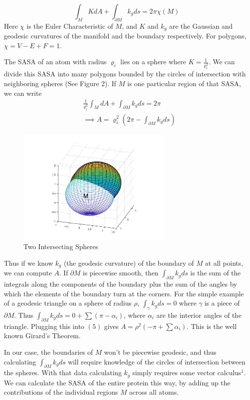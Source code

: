 \documentclass{article}
\begin{document}
\begin{equation}
\int_M KdA + \int_{\partial M} k_g ds = 2\pi\chi(M)
\end{equation}
Here $\chi$ is the Euler Characteristic of $M$, and $K$ and $k_g$ are the Gaussian and geodesic curvatures of the manifold and the boundary respectively. For polygons, $\chi=V-E+F=1$. 

The SASA of an atom with radius $\varrho_i$ lies on a sphere where $K=\frac{1}{\varrho_i^2}$. We can divide this SASA into many polygons bounded by the circles of intersection with neighboring spheres (See Figure 2). If $M$ is one particular region of that SASA, we can write 
\begin{align}\nonumber
&\frac{1}{\varrho_i^2}\int_M dA + \int_{\partial M} k_g ds= 2\pi \\
&\implies A=\varrho_i^2\left(2\pi-\int_{\partial M} k_g ds\right)
\end{align}

\begin{figure}[h!]
\caption{Two Intersecting Spheres}
\centerline{\includegraphics[width=3in]{spheres}}
\end{figure}
Thus if we know $k_g$ (the geodesic curvature) of the boundary of $M$ at all points, we can compute $A$. If $\partial M$ is piecewise smooth, then $\int_{\partial M} k_g ds$ is the sum of the integrals along the components of the boundary plus the sum of the angles by which the elements of the boundary turn at the corners. For the simple example of a geodesic triangle on a sphere of radius $\rho$, $\int_\gamma k_g ds=0$ where $\gamma$ is a piece of $\partial M$. Thus $\int_{\partial M} k_g ds=0+\sum (\pi-\alpha_i)$, where $\alpha_i$ are the interior angles of the triangle. Plugging this into $(5)$ gives $A=\rho^2(-\pi+\sum\alpha_i)$. This is the well known Girard's Theorem. 

In our case, the boundaries of $M$ won't be piecewise geodesic, and thus calculating $\int_{\partial M} k_g ds$ will require knowledge of the circles of intersection between the spheres. With that data calculating $k_g$ simply requires some vector calculus$^1$.
We can calculate the SASA of the entire protein this way, by adding up the contributions of the individual regions $M$ across all atoms.
\end{document}
